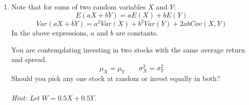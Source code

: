 \documentclass{./../../Latex/handout}
\begin{document}
\begin{enumerate}
\item Note that for sums of two random variables $X$ and $Y$:
$$ E(a X + b Y ) = a E(X) + b E(Y)$$
$$ Var(a X + b Y ) = a^2 Var(X) + b^2 Var(Y) + 2abCov(X,Y)$$
In the above expressions, $a$ and $b$ are constants. 

You are contemplating investing in two stocks with the same average return and spread.  
$$ \mu_X = \mu_Y \quad \quad \sigma^2_X = \sigma^2_Y $$
Should you pick any one stock at random or invest equally in both? \\~\\
\textit{Hint: Let $W=0.5 X + 0.5 Y$.} 
\end{enumerate}
\end{document}
